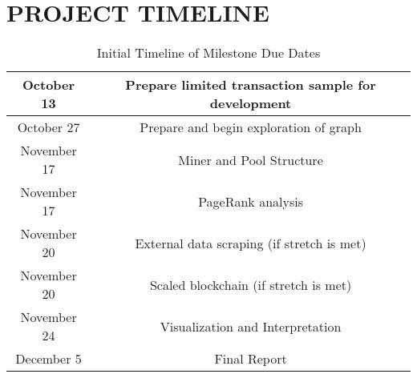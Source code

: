 \documentclass[letterpaper, 10 pt, conference]{ieeeconf}  %
\begin{document}
\section{PROJECT TIMELINE}

\begin{table}[h]
\caption{Initial Timeline of Milestone Due Dates}
\label{timeline}
\begin{center}
\begin{tabular}{|c||c|}
\hline
October 13 & Prepare limited transaction sample for development\\
\hline
October 27 & Prepare and begin exploration of graph\\
\hline
November 17 & Miner and Pool Structure\\
\hline
November 17 & PageRank analysis\\
\hline
November 20 & External data scraping (if stretch is met)\\
\hline
November 20 & Scaled blockchain (if stretch is met)\\
\hline
November 24 & Visualization and Interpretation\\
\hline
December 5 & Final Report\\
\hline
\end{tabular}
\end{center}
\end{table}







\end{document}
